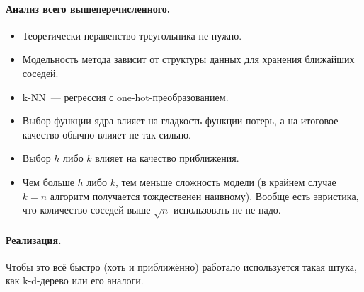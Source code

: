 \documentclass{article}
\begin{document}
    \paragraph{Анализ всего вышеперечисленного.}
    \begin{itemize}
        \item Теоретически неравенство треугольника не нужно.
        \item Модельность метода зависит от структуры данных для хранения ближайших соседей.
        \item k-NN~--- регрессия с one-hot-преобразованием.
        \item Выбор функции ядра влияет на гладкость функции потерь, а на итоговое качество обычно влияет не так сильно.
        \item Выбор $h$ либо $k$ влияет на качество приближения.
        \item Чем больше $h$ либо $k$, тем меньше сложность модели (в крайнем случае $k=n$ алгоритм получается тождественен наивному). Вообще есть эвристика, что количество соседей выше $\sqrt n$ использовать не не надо.
    \end{itemize}
    \paragraph{Реализация.}
    Чтобы это всё быстро (хоть и приближённо) работало используется такая штука, как k-d-дерево или его аналоги.
\end{document}
